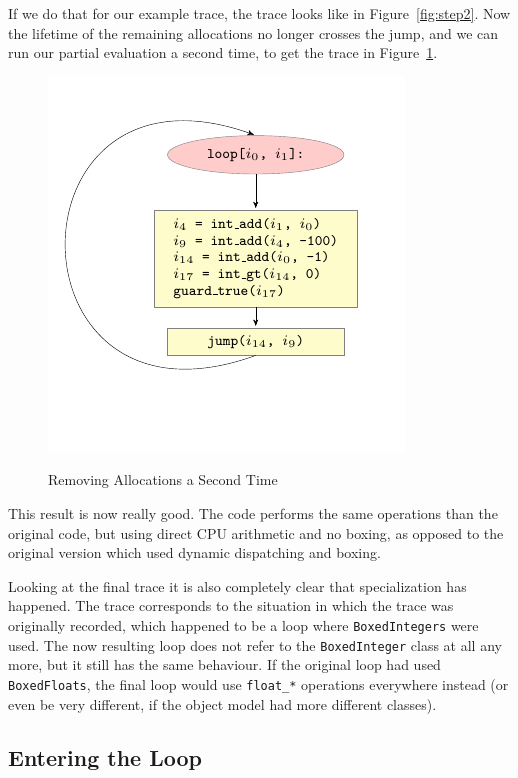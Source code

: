 \documentclass{sigplanconf}
\begin{document}
If we do that for our example trace, the trace looks like in Figure~\ref{fig:step2}.
Now the lifetime of the remaining allocations no longer crosses the jump, and
we can run our partial evaluation a second time, to get the trace in
Figure~\ref{fig:step3}.

\begin{figure}
\includegraphics{figures/step3.pdf}
\label{fig:step3}
\caption{Removing Allocations a Second Time}
\end{figure}

This result is now really good. The code performs the same operations than
the original code, but using direct CPU arithmetic and no boxing, as opposed to
the original version which used dynamic dispatching and boxing.

Looking at the final trace it is also completely clear that specialization has
happened. The trace corresponds to the situation in which the trace was
originally recorded, which happened to be a loop where \texttt{BoxedIntegers} were
used. The now resulting loop does not refer to the \texttt{BoxedInteger} class at
all any more, but it still has the same behaviour. If the original loop had
used \texttt{BoxedFloats}, the final loop would use \texttt{float\_*} operations
everywhere instead (or even be very different, if the object model had
more different classes).



\subsection{Entering the Loop}
\end{document}
